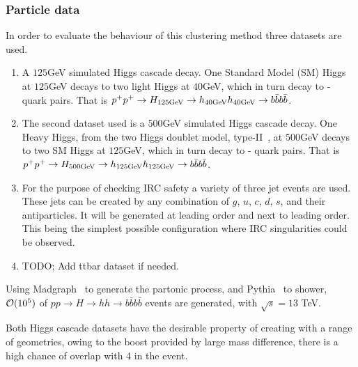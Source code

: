 \subsubsection{Particle data}

    In order to evaluate the behaviour of this clustering method three datasets are used.

    \begin{enumerate}
        \item A \(125\)GeV simulated Higgs cascade decay.
    One Standard Model (SM) Higgs at \(125\)GeV decays to two light Higgs at \(40\)GeV,
    which in turn decay to \beau{}-\bbar{} quark pairs.
    That is \(p^+ p^+ \rightarrow H_{125\text{GeV}} \rightarrow h_{40\text{GeV}} h_{40\text{GeV}} \rightarrow b \bar{b} b \bar{b}\).

     \item The second dataset used is a \(500\)GeV simulated Higgs cascade decay.
         One Heavy Higgs, from the two Higgs doublet model, type-II~\cite{2hdm_modelfile}, at \(500\)GeV decays to two SM Higgs at \(125\)GeV,
    which in turn decay to \beau{}-\bbar{} quark pairs.
    That is \(p^+ p^+ \rightarrow H_{500\text{GeV}} \rightarrow h_{125\text{GeV}} h_{125\text{GeV}} \rightarrow b \bar{b} b \bar{b}\).

    \item For the purpose of checking IRC safety a variety of three jet events are used.
        These jets can be created by any combination of \(g\), \(u\), \(c\), \(d\), \(s\), and their antiparticles.
        It will be generated at leading order and next to leading order.
        This being the simplest possible configuration where IRC singularities could be observed.

     \item {\color{red}TODO; Add ttbar dataset if needed.}

    \end{enumerate}

    Using Madgraph~\cite{alwall_madgraph2011} to generate the partonic process, and Pythia~\cite{sjostrand_pythia2015} to shower, ${\cal O}(10^5)$ of \(pp \rightarrow{} H \rightarrow{} hh \rightarrow{} b\bar{b}b\bar{b}\) events are generated, with $\sqrt{s}=13 $ TeV.


    Both Higgs cascade datasets have the desirable property of creating  with a range of geometries,
    owing to the boost provided by large mass difference,
    there is a high chance of overlap with 4  in the event.


